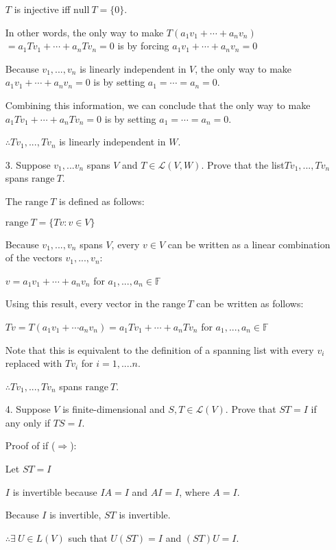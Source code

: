 \documentclass[fleqn]{article}
\begin{document}
\begin{enumerate}[nolistsep]
	$T$ is injective iff $\text{null}\ T = \{0\}$.
	
	In other words, the only way to make $T(a_1v_1 + \cdots + a_nv_n)$\newline$= a_1Tv_1 + \cdots + a_nTv_n = 0$ is by forcing $a_1v_1 + \cdots + a_nv_n = 0$ 
	
	Because $v_1,...,v_n$ is linearly independent in $V$, the only way to make $a_1v_1 + \cdots + a_nv_n = 0$ is by setting $a_1 = \cdots = a_n = 0$.
	
	Combining this information, we can conclude that the only way to make $a_1Tv_1 + \cdots + a_nTv_n = 0$ is by setting $a_1 = \cdots = a_n = 0$.
	
	$\therefore Tv_1,...,Tv_n$ is linearly independent in $W$.
	
		\item[3.] Suppose $v_1,...v_n$ spans $V$ and $T \in \mathcal{L}(V,W)$. Prove that the list\newline $Tv_1,...,Tv_n$ spans $\text{range}\ T$.

		The $\text{range}\ T$ is defined as follows:
		
		$\text{range}\ T = \{Tv : v \in V\}$
		
		Because $v_1,...,v_n$ spans $V$, every $v \in V$ can be written as a linear combination of the vectors $v_1,...,v_n$:
		
		$v = a_1v_1 + \cdots + a_nv_n$ for $a_1,...,a_n \in \mathbb{F}$
		
		Using this result, every vector in the $\text{range}\ T$ can be written as follows:
		
		$Tv = T(a_1v_1 + \cdots a_nv_n) = a_1Tv_1 + \cdots + a_nTv_n$ for $a_1,...,a_n \in \mathbb{F}$
		
		Note that this is equivalent to the definition of a spanning list with every $v_i$ replaced with $Tv_i$ for $i = 1,....n$.
		
		$\therefore Tv_1,...,Tv_n$ spans $\text{range}\ T$.
		
		\item[4.] Suppose $V$ is finite-dimensional and $S,T \in \mathcal{L}(V)$. Prove that $ST = I$ if any only if $TS = I$.
		
	Proof of if ($\Rightarrow$):
	
	Let $ST = I$
	
	$I$ is invertible because $IA = I$ and $AI = I$, where $A = I$.
	
	Because $I$ is invertible, $ST$ is invertible.
	
	$\therefore \exists\ U \in L(V)$ such that $U(ST) = I$ and $(ST)U = I$.
	

\end{enumerate}
\end{document}

